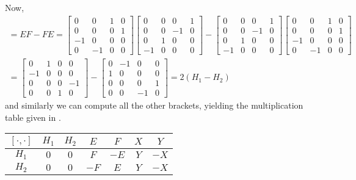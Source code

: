 \begin{example}
	Now,
	\begin{multline*}
		[E,F] = EF-FE = \begin{bmatrix}
			0 & 0 & 1 & 0 \\
			0 & 0 & 0 & 1 \\
			-1 & 0 & 0 & 0 \\
			0 & -1 & 0 & 0
 		\end{bmatrix} \begin{bmatrix}
			0 & 0 & 0 & 1 \\
			0 & 0 & -1 & 0 \\
			0 & 1 & 0 & 0 \\
			-1 & 0 & 0 & 0
 		\end{bmatrix} - \begin{bmatrix}
			0 & 0 & 0 & 1 \\
			0 & 0 & -1 & 0 \\
			0 & 1 & 0 & 0 \\
			-1 & 0 & 0 & 0
 		\end{bmatrix}\begin{bmatrix}
			0 & 0 & 1 & 0 \\
			0 & 0 & 0 & 1 \\
			-1 & 0 & 0 & 0 \\
			0 & -1 & 0 & 0
 		\end{bmatrix} \\
		= \begin{bmatrix}
			0 & 1 & 0 & 0 \\
			-1 & 0 & 0 & 0 \\
			0 & 0 & 0 & -1 \\
			0 & 0 & 1 & 0
 		\end{bmatrix} - \begin{bmatrix}
			0 & -1 & 0 & 0 \\
			1 & 0 & 0 & 0 \\
			0 & 0 & 0 & 1 \\
			0 & 0 & -1 & 0
 		\end{bmatrix} = 2(H_1 - H_2)
	\end{multline*}
	and similarly we can compute all the other brackets, yielding the multiplication table given in .
	\begin{table}
		\begin{center}
		\begin{tabular}{c|cccccc}
			$[\cdot,\cdot]$ & $H_1$ & $H_2$ & $E$ & $F$ & $X$ & $Y$ \\
			\hline
			$H_1$ & $0$ & $0$ & $F$ & $-E$ & $Y$ & $-X$ \\
			$H_2$ & $0$ & $0$ & $-F$ & $E$ & $Y$ & $-X$ \\

\end{tabular}
\end{center}
\end{table}
\end{example}
